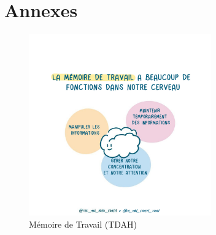 \documentclass[12pt,a4paper]{report}
\begin{document}
\chapter*{Annexes}

\begin{figure}[h]
    \centering
    \includegraphics[width=0.7\textwidth]{images/ADHD-Working-Memory.png}
    \caption{Mémoire de Travail (TDAH)}
    \label{fig:tdah}
\end{figure}
\end{document}
